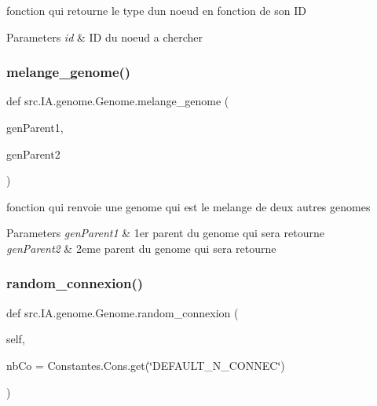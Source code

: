 fonction qui retourne le type d\textquotesingle{}un noeud en fonction de son ID 


\begin{DoxyParams}{Parameters}
{\em id} & ID du noeud a chercher \\
\hline
\end{DoxyParams}
\mbox{\label{classsrc_1_1_i_a_1_1genome_1_1_genome_aa0ad761608127d6f8cdb4287149643fd}} 
\subsubsection{\texorpdfstring{melange\+\_\+genome()}{melange\_genome()}}
{\footnotesize\ttfamily def src.\+I\+A.\+genome.\+Genome.\+melange\+\_\+genome (\begin{DoxyParamCaption}\item[{}]{gen\+Parent1,  }\item[{}]{gen\+Parent2 }\end{DoxyParamCaption})\hspace{0.3cm}{\ttfamily [static]}}



fonction qui renvoie une genome qui est le melange de deux autres genomes 


\begin{DoxyParams}{Parameters}
{\em gen\+Parent1} & 1er parent du genome qui sera retourne \\
\hline
{\em gen\+Parent2} & 2eme parent du genome qui sera retourne \\
\hline
\end{DoxyParams}
\mbox{\label{classsrc_1_1_i_a_1_1genome_1_1_genome_a361c26903fa6bc978955402580c8d1b2}} 
\subsubsection{\texorpdfstring{random\+\_\+connexion()}{random\_connexion()}}
{\footnotesize\ttfamily def src.\+I\+A.\+genome.\+Genome.\+random\+\_\+connexion (\begin{DoxyParamCaption}\item[{}]{self,  }\item[{}]{nb\+Co = {\ttfamily Constantes.Cons.get(\char`\"{}DEFAULT\+\_\+N\+\_\+CONNEC\char`\"{})} }\end{DoxyParamCaption})}



